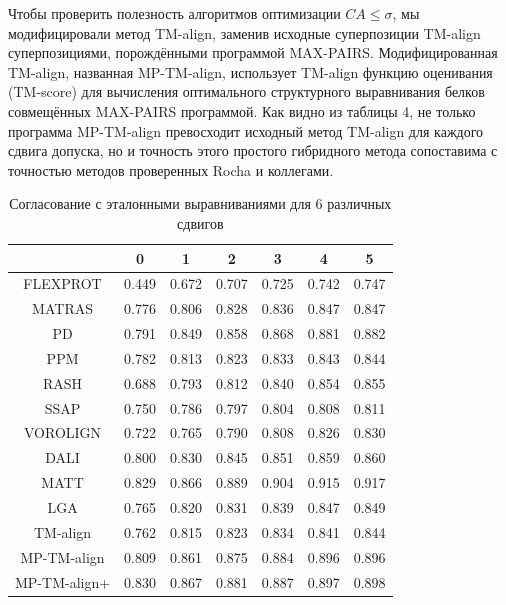 \documentclass[a4papper]{article}
\begin{document}
Чтобы проверить полезность алгоритмов оптимизации $CA \leq \sigma$, мы модифицировали метод TM-align, заменив исходные суперпозиции TM-align суперпозициями, порождёнными программой MAX-PAIRS. Модифицированная TM-align, названная MP-TM-align, использует TM-align функцию оценивания (TM-score) для вычисления оптимального структурного выравнивания белков совмещённых MAX-PAIRS программой. Как видно из таблицы 4, не только программа MP-TM-align превосходит исходный метод TM-align для каждого сдвига допуска, но и точность этого простого гибридного метода сопоставима с точностью методов проверенных Rocha и коллегами.
\begin{center}
\begin{table}
\caption{ Согласование с эталонными выравниваниями для 6 различных сдвигов}
\begin{tabular}{|c|cccccc|}
\hline
&0&1&2&3&4&5\\
\hline
FLEXPROT&		0.449&	0.672&	0.707&	0.725&	0.742&	0.747\\
MATRAS&			0.776&	0.806&	0.828&	0.836&	0.847&	0.847\\
PD&				0.791&	0.849&	0.858&	0.868&	0.881&	0.882\\
PPM&			0.782& 	0.813& 	0.823&	0.833&	0.843&	0.844\\
RASH&			0.688&	0.793&	0.812&	0.840&	0.854&	0.855\\
SSAP&			0.750&	0.786&	0.797&	0.804&	0.808&	0.811\\
VOROLIGN&		0.722&	0.765&	0.790&	0.808&	0.826&	0.830\\
DALI&			0.800&	0.830&	0.845&	0.851&	0.859&	0.860\\
MATT&			0.829&	0.866&	0.889&	0.904&	0.915&	0.917\\
LGA&			0.765&	0.820&	0.831& 	0.839&	0.847&	0.849\\
TM-align&		0.762&	0.815&	0.823&	0.834&	0.841&	0.844\\
MP-TM-align&	0.809&	0.861&	0.875&	0.884&	0.896&	0.896\\
MP-TM-align+&	0.830&	0.867&	0.881&	0.887&	0.897&	0.898\\
\hline
\end{tabular}
\end{table}
\end{center}
\end{document}
